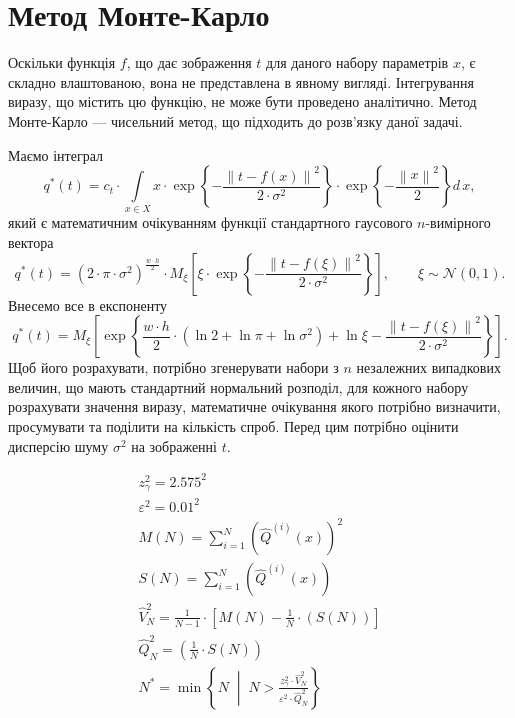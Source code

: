 \section{Метод Монте-Карло}

Оскільки функція $f$, що дає зображення $t$ для даного набору параметрів $x$,
є складно влаштованою, вона не представлена в явному вигляді.
Інтегрування виразу, що містить цю функцію, не може бути проведено аналітично.
Метод Монте-Карло --- чисельний метод, що підходить до розв'язку даної задачі.

Маємо інтеграл
\begin{equation*}
  q^* \left( t \right)
  = c_t
    \cdot \int\limits_{x \in X}
      x
      \cdot \exp{\left\{ - \frac{\left\| t - f\left( x \right) \right\|^2}
                                {2 \cdot \sigma^2} \right\}}
      \cdot \exp{\left\{ - \frac{\left\| x \right\|^2}{2} \right\}}
    d\,x,
\end{equation*}
який є математичним очікуванням функції
стандартного гаусового $n$-вимірного вектора
\begin{equation*}
  q^* \left( t \right)
  = \left( 2 \cdot \pi \cdot \sigma^2 \right)^{\frac{w \cdot h}{2}}
    \cdot M_{\xi}\left[
      \xi
      \cdot \exp{\left\{ - \frac{\left\| t - f\left( \xi \right) \right\|^2}
        {2 \cdot \sigma^2} \right\}} \right], \qquad
    \xi \sim \mathcal{N}\left( 0, 1 \right).
\end{equation*}
Внесемо все в експоненту
\begin{equation*}
  q^* \left( t \right)
  = M_{\xi}\left[
    \exp{\left\{
        \frac{w \cdot h}{2}
          \cdot \left( \ln{2} + \ln{\pi} + \ln{\sigma^2} \right)
        + \ln{\xi}
        - \frac{\left\| t - f\left( \xi \right) \right\|^2}
        {2 \cdot \sigma^2} \right\}
    } \right].
\end{equation*}
Щоб його розрахувати,
потрібно згенерувати набори з $n$ незалежних випадкових величин,
що мають стандартний нормальний розподіл,
для кожного набору розрахувати значення виразу,
математичне очікування якого потрібно визначити,
просумувати та поділити на кількість спроб.
Перед цим потрібно оцінити дисперсію шуму $\sigma^2$ на зображенні $t$.

\begin{equation*}
  \begin{split}
    z^2_{\gamma} = 2.575^2 \\
    \varepsilon^2 = 0.01^2 \\
    M\left( N \right) = \sum_{i=1}^{N} \left(
        \hat{Q}^{\left( i \right)}\left( x \right)
      \right)^2 \\
      S\left( N \right) = \sum_{i=1}^{N} \left(
      \hat{Q}^{\left( i \right)}\left( x \right)
      \right) \\
    \hat{V}^2_N = \frac{1}{N-1}
      \cdot \left[ M\left( N \right) - \frac{1}{N}
        \cdot \left( S\left( N \right) \right) \right] \\
    \hat{Q}^2_N = \left( \frac{1}{N} \cdot S\left( N \right) \right) \\
    N^* = \min{\left\{ N \;\middle|\;
      N > \frac{z^2_{\gamma} \cdot \hat{V}^2_N}
        {\varepsilon^2 \cdot \hat{Q}^2_N} \right\}}
  \end{split}
\end{equation*}
